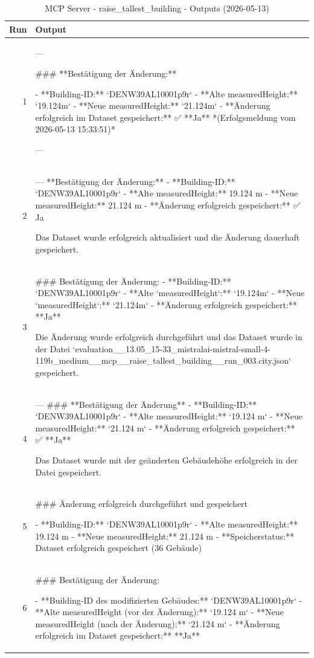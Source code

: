 \documentclass[a4paper,11pt]{article}
\begin{document}
\begin{table}[ht]
\centering
\scriptsize
\caption{MCP Server - raise\_tallest\_building - Outputs (2026-05-13)}
\label{tab:mcp\_raise\_tallest\_building\_outputs\_2026-05-13}
\begin{tabular}{r p{12cm}}
\hline
Run & Output \\
\hline
1 & ---

\#\#\# **Bestätigung der Änderung:**

- **Building-ID:** `DENW39AL10001p9r`
- **Alte measuredHeight:** `19.124m`
- **Neue measuredHeight:** `21.124m`
- **Änderung erfolgreich im Dataset gespeichert:** ✅ **Ja**
  *(Erfolgsmeldung vom 2026-05-13 15:33:51)*

--- \\
2 & ---
**Bestätigung der Änderung:**
- **Building-ID:** `DENW39AL10001p9r`
- **Alte measuredHeight:** 19.124 m
- **Neue measuredHeight:** 21.124 m
- **Änderung erfolgreich gespeichert:** ✅ Ja

Das Dataset wurde erfolgreich aktualisiert und die Änderung dauerhaft gespeichert. \\
3 & \#\#\# Bestätigung der Änderung:
- **Building-ID:** `DENW39AL10001p9r`
- **Alte `measuredHeight`:** `19.124m`
- **Neue `measuredHeight`:** `21.124m`
- **Änderung erfolgreich gespeichert:** **Ja**

Die Änderung wurde erfolgreich durchgeführt und das Dataset wurde in der Datei `evaluation\_\_13.05\_15-33\_mistralai-mistral-small-4-119b\_medium\_\_mcp\_\_raise\_tallest\_building\_\_run\_003.city.json` gespeichert. \\
4 & ---
\#\#\# **Bestätigung der Änderung**
- **Building-ID:** `DENW39AL10001p9r`
- **Alte measuredHeight:** `19.124 m`
- **Neue measuredHeight:** `21.124 m`
- **Änderung erfolgreich gespeichert:** ✅ **Ja**

Das Dataset wurde mit der geänderten Gebäudehöhe erfolgreich in der Datei gespeichert. \\
5 & \#\#\# Änderung erfolgreich durchgeführt und gespeichert

- **Building-ID:** `DENW39AL10001p9r`
- **Alte measuredHeight:** 19.124 m
- **Neue measuredHeight:** 21.124 m
- **Speicherstatus:** Dataset erfolgreich gespeichert (36 Gebäude) \\
6 & \#\#\# Bestätigung der Änderung:

- **Building-ID des modifizierten Gebäudes:** `DENW39AL10001p9r`
- **Alte measuredHeight (vor der Änderung):** `19.124 m`
- **Neue measuredHeight (nach der Änderung):** `21.124 m`
- **Änderung erfolgreich im Dataset gespeichert:** **Ja**


\end{tabular}
\end{table}
\end{document}
